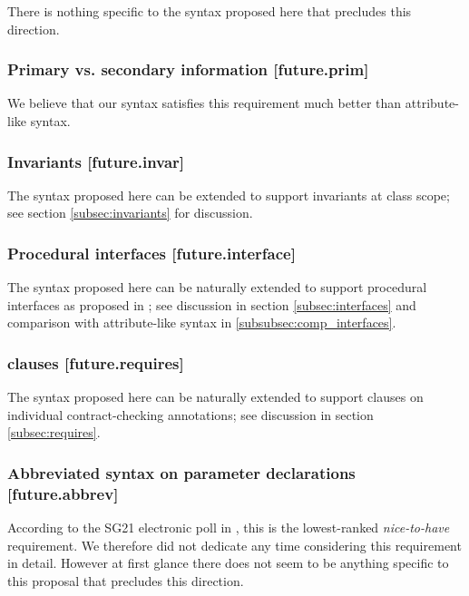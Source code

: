 There is nothing specific to the syntax proposed here that precludes this direction.

\subsubsection{Primary vs. secondary information  [future.prim]}

We believe that our syntax satisfies this requirement much better than attribute-like syntax.

\subsubsection{Invariants  [future.invar]}

The syntax proposed here can be extended to support invariants at class scope; see section \ref{subsec:invariants} for discussion.

\subsubsection{Procedural interfaces  [future.interface]}

The syntax proposed here can be naturally extended to support procedural interfaces as proposed in \cite{P0465R0}; see discussion in section \ref{subsec:interfaces} and comparison with attribute-like syntax in \ref{subsubsec:comp_interfaces}.

\subsubsection{ clauses  [future.requires]}

The syntax proposed here can be naturally extended to support  clauses on individual contract-checking annotations; see discussion in section \ref{subsec:requires}.

\subsubsection{Abbreviated syntax on parameter declarations  [future.abbrev]}

According to the SG21 electronic poll in \cite{P2885R3}, this is the lowest-ranked \emph{nice-to-have} requirement. We therefore did not dedicate any time considering this requirement in detail. However at first glance there does not seem to be anything specific to this proposal that precludes this direction.

